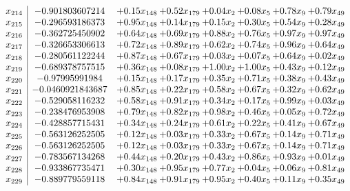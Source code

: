 \documentclass[8pt]{article}
\begin{document}
\[\begin{array}{c| c c@{\hskip 2pt} c@{\hskip 2pt} c@{\hskip 2pt} c@{\hskip 2pt} c@{\hskip 2pt} c@{\hskip 2pt} }
 x_{214}   &  -0.901803607214 & +  0.15 x_{148} & +  0.52 x_{179} & +  0.04 x_{2} & +  0.08 x_{5} & +  0.78 x_{9} & +  0.79 x_{49}\\
 x_{215}   &  -0.296593186373 & +  0.95 x_{148} & +  0.14 x_{179} & +  0.15 x_{2} & +  0.30 x_{5} & +  0.54 x_{9} & +  0.28 x_{49}\\
 x_{216}   &  -0.362725450902 & +  0.64 x_{148} & +  0.69 x_{179} & +  0.88 x_{2} & +  0.76 x_{5} & +  0.97 x_{9} & +  0.97 x_{49}\\
 x_{217}   &  -0.326653306613 & +  0.72 x_{148} & +  0.89 x_{179} & +  0.62 x_{2} & +  0.74 x_{5} & +  0.96 x_{9} & +  0.64 x_{49}\\
 x_{218}   &  -0.280561122244 & +  0.87 x_{148} & +  0.67 x_{179} & +  0.03 x_{2} & +  0.07 x_{5} & +  0.64 x_{9} & +  0.02 x_{49}\\
 x_{219}   &  -0.689378757515 & +  0.36 x_{148} & +  0.08 x_{179} & +  1.00 x_{2} & +  1.00 x_{5} & +  0.43 x_{9} & +  0.12 x_{49}\\
 x_{220}   &  -0.97995991984 & +  0.15 x_{148} & +  0.17 x_{179} & +  0.35 x_{2} & +  0.71 x_{5} & +  0.38 x_{9} & +  0.43 x_{49}\\
 x_{221}   &  -0.0460921843687 & +  0.85 x_{148} & +  0.22 x_{179} & +  0.58 x_{2} & +  0.67 x_{5} & +  0.32 x_{9} & +  0.62 x_{49}\\
 x_{222}   &  -0.529058116232 & +  0.58 x_{148} & +  0.91 x_{179} & +  0.34 x_{2} & +  0.17 x_{5} & +  0.99 x_{9} & +  0.03 x_{49}\\
 x_{223}   &  -0.238476953908 & +  0.79 x_{148} & +  0.82 x_{179} & +  0.98 x_{2} & +  0.46 x_{5} & +  0.05 x_{9} & +  0.72 x_{49}\\
 x_{224}   &  -0.428857715431 & +  0.34 x_{148} & +  0.24 x_{179} & +  0.61 x_{2} & +  0.22 x_{5} & +  0.41 x_{9} & +  0.67 x_{49}\\
 x_{225}   &  -0.563126252505 & +  0.12 x_{148} & +  0.03 x_{179} & +  0.33 x_{2} & +  0.67 x_{5} & +  0.14 x_{9} & +  0.71 x_{49}\\
 x_{226}   &  -0.563126252505 & +  0.12 x_{148} & +  0.03 x_{179} & +  0.33 x_{2} & +  0.67 x_{5} & +  0.14 x_{9} & +  0.71 x_{49}\\
 x_{227}   &  -0.783567134268 & +  0.44 x_{148} & +  0.20 x_{179} & +  0.43 x_{2} & +  0.86 x_{5} & +  0.93 x_{9} & +  0.01 x_{49}\\
 x_{228}   &  -0.933867735471 & +  0.30 x_{148} & +  0.95 x_{179} & +  0.77 x_{2} & +  0.04 x_{5} & +  0.06 x_{9} & +  0.81 x_{49}\\
 x_{229}   &  -0.889779559118 & +  0.84 x_{148} & +  0.91 x_{179} & +  0.95 x_{2} & +  0.40 x_{5} & +  0.11 x_{9} & +  0.35 x_{49}\\

\end{array}\]
\end{document}
